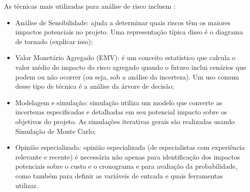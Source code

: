 As técnicas mais utilizadas para análise de risco incluem \cite{PMBOK2008}:
\begin{itemize}
\item Análise de Sensibilidade: ajuda a determinar quais riscos têm os maiores impactos potenciais no projeto. Uma representação típica disso é o diagrama de tornado (explicar isso);
\item Valor Monetário Agregado (EMV): é um conceito estatístico que calcula o valor médio do impacto do risco agregado quando o futuro inclui cenários que podem ou não ocorrer (ou seja, sob a análise da incerteza). Um uso comum desse tipo de técnica é a análise da árvore de decisão;
\item Modelagem e simulação: simulação utiliza um modelo que converte as incertezas especificadas e detalhadas em seu potencial impacto sobre os objetivos do projeto. As simulações iterativas gerais são realizadas usando Simulação de Monte Carlo;
\item Opinião especializada: opinião especializada (de especialistas com experiência relevante e recente) é necessária não apenas para identificação dos impactos potenciais sobre o custo e o cronograma e para avaliação da probabilidade, como também para definir as variáveis de entrada e quais ferramentas utilizar.
\end{itemize}

